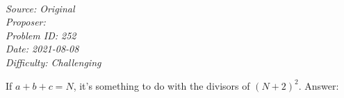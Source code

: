\SSbreak\\
\emph{Source: Original}\\
\emph{Proposer: \Pnjoy}\\
\emph{Problem ID: 252}\\
\emph{Date: 2021-08-08}\\
\emph{Difficulty: Challenging}\\
\SSbreak

\bigskip

\begin{solution}\hfil\medskip
  
    If $a + b + c = N$, it's something to do with the divisors of $(N + 2)^2$. Answer: \fbox{}
\end{solution}\bigskip
